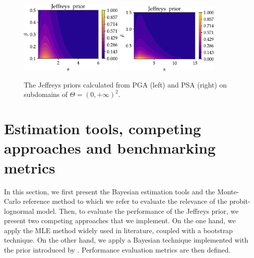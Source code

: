         \begin{figure}[!ht]
            \centering
            {\includegraphics[width=5cm]{figures/PREM/Jeff_prior_PGA-2.pdf}}\hspace*{0.5cm}
            {\includegraphics[width=5cm]{figures/PREM/Jeff_prior_PSA-1.pdf}}
            \caption{The Jeffreys priors calculated from PGA (left) and PSA (right) on subdomains of $\Theta=(0,+\infty)^2$.}
             \label{uncIM:fig:jeff_prior}
        \end{figure}

\section{Estimation tools, competing approaches and benchmarking metrics} \label{uncIM:sec:tools}

    In this section, we first present the Bayesian estimation tools and the Monte-Carlo reference method to which we refer to evaluate the relevance of the probit-lognormal model. Then, to evaluate the performance of the Jeffreys prior, we present two competing approaches that we implement. On the one hand, we apply the MLE method widely used in literature, coupled with a bootstrap technique. On the other hand, we apply a Bayesian technique implemented with the prior introduced by \citet{straub_improved_2008}. Performance evaluation metrics are then defined.


